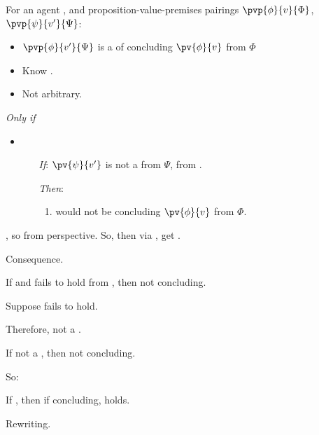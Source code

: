 \begin{note}
  \begin{proposition}
    For an agent \vAgent{}, and proposition-value-premises pairings \(\pvp{\phi}{v}{\Phi}\), \(\pvp{\psi}{v'}{\Psi}\):

    \begin{itemize}
    \item
      \(\pvp{\phi}{v'}{\Psi}\) is a \requ{} of \vAgent{} concluding \(\pv{\phi}{v}\) from \(\Phi\)
    \item
      Know \pevent{}.
    \item
      Not arbitrary.
    \end{itemize}

    \emph{Only if}

    \begin{itemize}
    \item
        \begin{enumerate}
        \item[\emph{If}:]
          \(\pv{\psi}{v'}\) is not a \fc{} from \(\Psi\), from .
        \item[\emph{Then}:]
          \begin{enumerate}[label=\alph*., ref=(\alph*), resume]
          \item
            \label{def:curb:fail}
            \vAgent{} would not be concluding \(\pv{\phi}{v}\) from \(\Phi\).
          \end{enumerate}
      \end{enumerate}
    \end{itemize}
    \begin{argument}
      \requ{}, so \curb{} from perspective.
      So, then via , get \curb{}.
    \end{argument}
  \end{proposition}
\end{note}

\begin{note}
  Consequence.

  \begin{proposition}
    If \requ{} and \ros{} fails to hold from \agpe{}, then not concluding.
    \begin{argument}
      Suppose \ros{} fails to hold.

      Therefore, not a \fc{}.

      If not a \fc{}, then not concluding.
    \end{argument}
  \end{proposition}

  So:

  \begin{proposition}
    If \requ{}, then if concluding, \ros{} holds.

    \begin{argument}
      Rewriting.
    \end{argument}
  \end{proposition}
\end{note}


